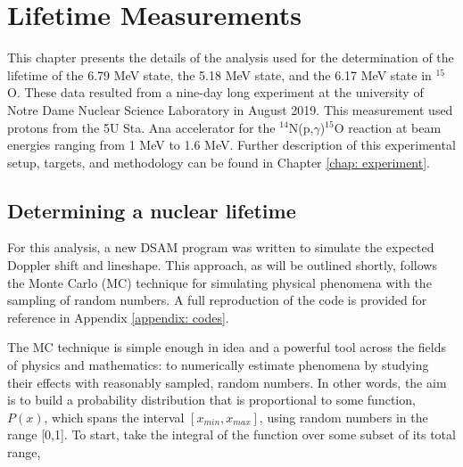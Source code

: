 %
%
%
%
%
%
%
%
%
%


%
%


\chapter{Lifetime Measurements}
\label{chap: lifetime}

This chapter presents the details of the analysis used for the determination of the lifetime of the 6.79 MeV state, the 5.18 MeV state, and the 6.17 MeV state in $^{15}$O. These data resulted from a nine-day long experiment at the university of Notre Dame Nuclear Science Laboratory in August 2019. This measurement used protons from the 5U Sta. Ana accelerator for the $^{14}$N(p,$\gamma$)$^{15}$O reaction at beam energies ranging from 1 MeV to 1.6 MeV. Further description of this experimental setup, targets, and methodology can be found in Chapter \ref{chap: experiment}.	

\section{Determining a nuclear lifetime}
\label{sec: lifetime determination}

For this analysis, a new DSAM program was written to simulate the expected Doppler shift and lineshape. This approach, as will be outlined shortly, follows the Monte Carlo (MC) technique for simulating physical phenomena with the sampling of random numbers. A full reproduction of the code is provided for reference in Appendix \ref{appendix: codes}. 

The MC technique is simple enough in idea and a powerful tool across the fields of physics and mathematics: to numerically estimate phenomena by studying their effects with reasonably sampled, random numbers. In other words, the aim is to build a probability distribution that is proportional to some function, $P(x)$, which spans the interval $[x_{min}, x_{max}]$, using random numbers in the range [0,1]. To start, take the integral of the function over some subset of its total range,

